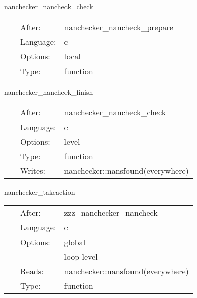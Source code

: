 \vspace{5mm}


\hspace{5mm} nanchecker\_nancheck\_check 

\hspace{5mm}{\it check for nans } 


\hspace{5mm}

 \begin{tabular*}{160mm}{cll} 
~ & After:  & nanchecker\_nancheck\_prepare \\ 
~ & Language:  & c \\ 
~ & Options:  & local \\ 
~ & Type:  & function \\ 
\end{tabular*} 


\vspace{5mm}


\hspace{5mm} nanchecker\_nancheck\_finish 

\hspace{5mm}{\it count nans in nanchecker::nansfound } 


\hspace{5mm}

 \begin{tabular*}{160mm}{cll} 
~ & After:  & nanchecker\_nancheck\_check \\ 
~ & Language:  & c \\ 
~ & Options:  & level \\ 
~ & Type:  & function \\ 
~ & Writes:  & nanchecker::nansfound(everywhere) \\ 
\end{tabular*} 


\vspace{5mm}


\hspace{5mm} nanchecker\_takeaction 

\hspace{5mm}{\it output nanchecker::nanmask and take action according to nanchecker::action\_if\_found } 


\hspace{5mm}

 \begin{tabular*}{160mm}{cll} 
~ & After:  & zzz\_nanchecker\_nancheck \\ 
~ & Language:  & c \\ 
~ & Options:  & global \\ 
~& ~ &loop-level\\ 
~ & Reads:  & nanchecker::nansfound(everywhere) \\ 
~ & Type:  & function \\ 
\end{tabular*} 


